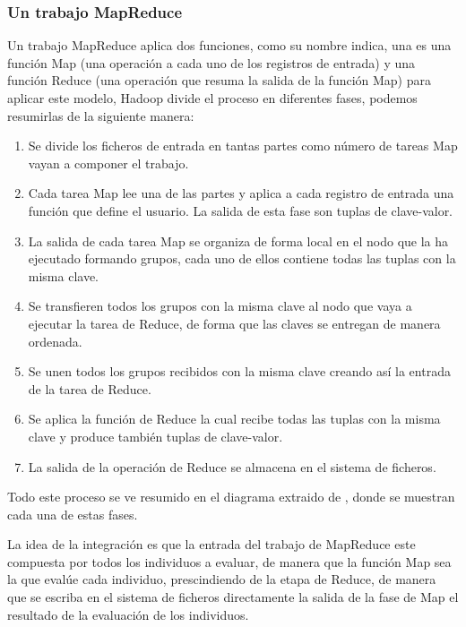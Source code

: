 \subsubsection{Un trabajo MapReduce}


Un trabajo MapReduce aplica dos funciones, como su nombre indica, una es una función Map (una operación a cada uno de los registros de entrada) y una función Reduce (una operación que resuma la salida de la función Map) para aplicar este modelo, Hadoop divide el proceso en diferentes fases, podemos resumirlas de la siguiente manera:

\begin{enumerate}
	\item Se divide los ficheros de entrada en tantas partes como n\'umero de tareas Map vayan a componer el trabajo.
	\item Cada tarea Map lee una de las partes y aplica a cada registro de entrada una función que define el usuario. La salida de esta fase son tuplas de clave-valor.
	\item La salida de cada tarea Map se organiza de forma local en el nodo que la ha ejecutado formando grupos, cada uno de ellos contiene todas las tuplas con la misma clave.
	\item Se transfieren todos los grupos con la misma clave al nodo que vaya a ejecutar la tarea de Reduce, de forma que las claves se entregan de manera ordenada.
	\item Se unen todos los grupos recibidos con la misma clave creando así la entrada de la tarea de Reduce.
	\item Se aplica la función de Reduce la cual recibe todas las tuplas con la misma clave y produce también tuplas de clave-valor.
	\item La salida de la operación de Reduce se almacena en el sistema de ficheros.
\end{enumerate}

Todo este proceso se ve resumido en el diagrama  extraido de \cite{cloudera-mapreduce}, donde se muestran cada una de estas fases.

\label{fase-map-eval}
La idea de la integración es que la entrada del trabajo de MapReduce este compuesta por todos los individuos a evaluar, de manera que la función Map sea la que evalúe cada individuo, prescindiendo de la etapa de Reduce, de manera que se escriba en el sistema de ficheros directamente la salida de la fase de Map el resultado de la evaluación de los individuos.











